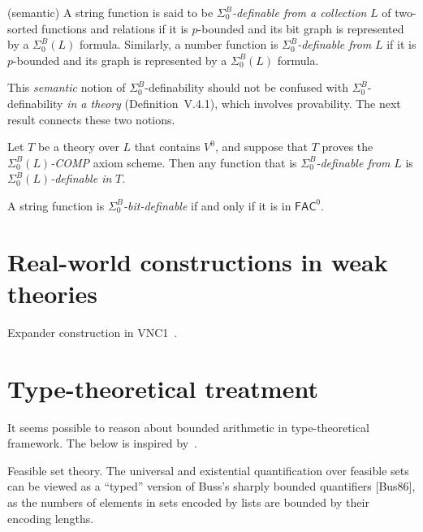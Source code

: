 \begin{definition}[V.4.12] (semantic)
A string function is said to be \(\Sigma^B_0\)\textit{-definable from a collection} \(L\) of two-sorted functions and relations if it is \(p\)-bounded and its bit graph is represented by a \(\Sigma^B_0(L)\) formula.  
Similarly, a number function is \(\Sigma^B_0\)\textit{-definable from} \(L\) if it is \(p\)-bounded and its graph is represented by a \(\Sigma^B_0(L)\) formula.

\medskip
This \emph{semantic} notion of \(\Sigma^B_0\)-definability should not be confused with \(\Sigma^B_0\)-definability \emph{in a theory} (Definition~V.4.1), which involves provability.  
The next result connects these two notions.
\end{definition}

\begin{corollary}[V.4.13]
Let \(T\) be a theory over \(L\) that contains \(V^0\), and suppose that \(T\) proves the 
\(\Sigma^B_0(L)\)\textit{-COMP} axiom scheme.  
Then any function that is \(\Sigma^B_0\)\textit{-definable from} \(L\) is 
\(\Sigma^B_0(L)\)\textit{-definable in} \(T\).
\end{corollary}


\begin{proposition}[V.4.7]
A string function is \(\Sigma^B_0\)\textit{-bit-definable} if and only if it is in \(\mathsf{FAC}^0\).
\end{proposition}

\begin{corollary}[V.2.4]
\leavevmode
\end{corollary} 



\section{Real-world constructions in weak theories}
Expander construction in VNC1~\cite{BUSS2020102796}.

\section{Type-theoretical treatment}
It seems possible to reason about bounded arithmetic in type-theoretical framework.
The below is inspired by~\cite{Li2025FeasibleMathematics}.

Feasible set theory. The universal and existential quantification over feasible sets
can be viewed as a “typed” version of Buss’s sharply bounded quantifiers [Bus86],
as the numbers of elements in sets encoded by lists are bounded by their encoding
lengths.


